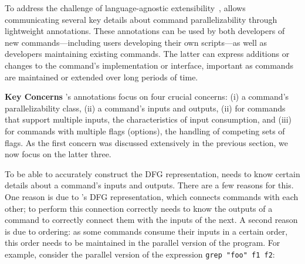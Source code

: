 \documentclass[letterpaper,twocolumn,10pt]{article}
\newcommand{\heading}[1]{\vspace{4pt}\noindent\textbf{#1}\enspace}
\newcommand{\ttt}[1]{\texttt{#1}}
\newcommand{\nv}[1]{[{\color{cyan}nv: #1}]}
\newcommand{\kk}[1]{[{\color{magenta}kk: #1}]}
\begin{document}

To address the challenge of language-agnostic extensibility~, \sys allows communicating several key details about command parallelizability through lightweight annotations.
These annotations can be used by both developers of new commands---including users developing their own scripts---as well as developers maintaining existing commands.
The latter can express additions or changes to the command's implementation or interface, important as commands are maintained or extended over long periods of time.

\heading{Key Concerns}
\sys's annotations focus on four crucial concerns:
  (i) a command's parallelizability class,
  (ii) a command's inputs and outputs,
  (ii) for commands that support multiple inputs, the characteristics of input consumption, and
  (iii) for commands with multiple flags (options), the handling of competing sets of flags.
As the first concern was discussed extensively in the previous section, we now focus on the latter three.

To be able to accurately construct the DFG representation, \sys needs to know certain details about a command's inputs and outputs.
There are a few reasons for this.
One reason is due to \sys's DFG representation, which connects commands with each other;
  to perform this connection correctly \sys needs to know the outputs of a command to correctly connect them with the inputs of the next.
A second reason is due to ordering:
  as some commands consume their inputs in a certain order, this order needs to be maintained in the parallel version of the program.
For example, consider the parallel version of the expression \ttt{grep "foo" f1 f2}:
\end{document}
